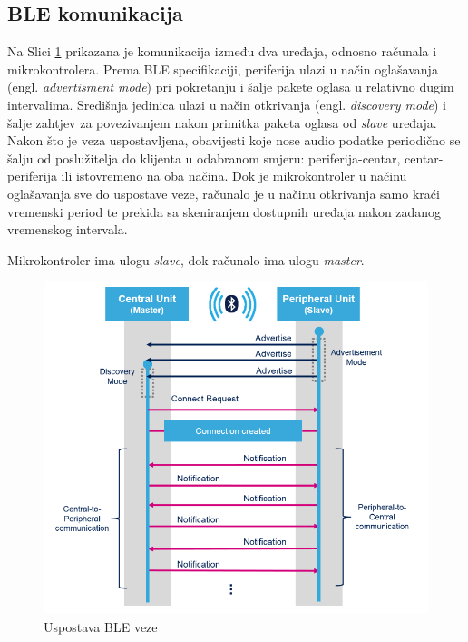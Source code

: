 \subsection{BLE komunikacija}

Na Slici \ref{fig:ble_connection_setup} prikazana je komunikacija između dva uređaja, odnosno računala i mikrokontrolera. Prema BLE specifikaciji, periferija ulazi u način oglašavanja (engl. \textit{advertisment mode}) pri pokretanju i šalje pakete oglasa u relativno dugim intervalima. Središnja jedinica ulazi u način otkrivanja (engl. \textit{discovery mode}) i šalje zahtjev za povezivanjem nakon primitka paketa oglasa od \textit{slave} uređaja. Nakon što je veza uspostavljena, obavijesti koje nose audio podatke periodično se šalju od poslužitelja do klijenta u odabranom smjeru: periferija-centar, centar-periferija ili istovremeno na oba načina. Dok je mikrokontroler u načinu oglašavanja sve do uspostave veze, računalo je u načinu otkrivanja samo kraći vremenski period te prekida sa skeniranjem dostupnih uređaja nakon zadanog vremenskog intervala.

Mikrokontroler ima ulogu \textit{slave}, dok računalo ima ulogu \textit{master}. 

\begin{figure}[ht]
	\centering
	\includegraphics[scale=0.7]{imgs/ble_connection_setup}
	\caption{Uspostava BLE veze \cite{fpaudbvlink}}
	\label{fig:ble_connection_setup}
\end{figure}


